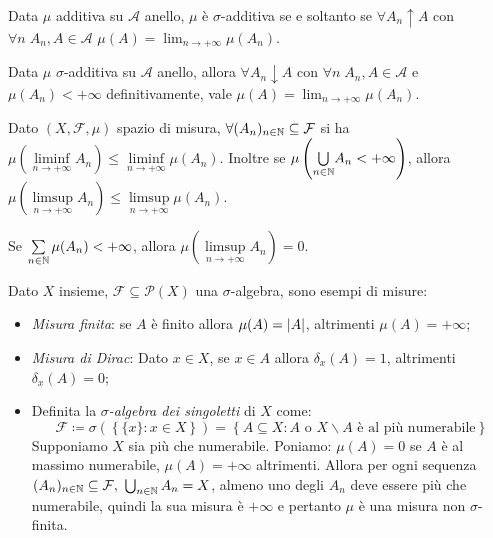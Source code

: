 \begin{exercise}
	Data $\mu$ additiva su $\mathcal{A}$ anello, $\mu$ è $\sigma$-additiva se e soltanto se $\forall A_n \uparrow A$ con $\forall n\; A_n,A \in \mathcal{A}$ $\mu(A)=\lim_{n\to +\infty} \mu(A_n)$.
\end{exercise}
\begin{exercise}
	Data $\mu$ $\sigma$-additiva su $\mathcal{A}$ anello, allora $\forall A_n \downarrow A$ con $\forall n\; A_n,A \in \mathcal{A}$ e $\mu(A_n) < + \infty$ definitivamente, vale $\mu(A)=\lim_{n\rightarrow +\infty} \mu(A_n)$.
\end{exercise}
\begin{exercise}
	Dato $(X,\mathcal{F}, \mu)$ spazio di misura, $\forall (A_n)_{n\in\mathbb{N}}\subseteq\mathcal{F}$  si ha $\mu\left(\underset{n\rightarrow +\infty}{\liminf} A_n\right) \leq \underset{n\rightarrow +\infty}{\liminf} \mu (A_n)$. Inoltre se $\mu\left(\underset{n\in\mathbb{N}}{\bigcup} A_n <+\infty\right)$, allora $\mu\left(\underset{n\rightarrow +\infty}{\limsup} A_n\right) \leq \underset{n\rightarrow +\infty}{\limsup} \mu (A_n)$.
\end{exercise}
\begin{exercise}
	Se $\sum\limits_{n\in\mathbb{N}} \mu(A_n) < +\infty$, allora $\mu\left(\underset{n\rightarrow +\infty}{\limsup} A_n\right)=0$.
\end{exercise}
\begin{example}
	Dato $X$ insieme, $\mathcal{F}\subseteq \mathscr{P}(X)$ una $\sigma$-algebra, sono esempi di misure:
	\begin{itemize}
		\item \emph{Misura finita}: se $A$ è finito allora $\mu(A)=\left|A\right|$, altrimenti $\mu(A)=+\infty$;
		\item \emph{Misura di Dirac}: Dato $x\in X$, se $x\in A$ allora $\delta_x(A)=1$, altrimenti $\delta_x(A)=0$;
		\item Definita la \emph{$\sigma$-algebra dei singoletti} di $ X $ come:
		\[ \mathcal{F} \coloneqq \sigma\left( \left\{ \{x\} : x\in X \right\} \right) = \left\{ A\subseteq X : A \text{ o } X\smallsetminus A \text{ è al più numerabile} \right\} \]
		Supponiamo $ X $ sia più che numerabile. Poniamo: $ \mu(A) = 0 $ se $ A $ è al massimo numerabile, $ \mu(A) = +\infty $ altrimenti. 
		Allora per ogni sequenza $(A_n)_{n\in\N}\subseteq\mathcal{F},\ \bigcup_{n\in\N} A_n=X$, almeno uno degli $A_n$ deve essere più che numerabile, quindi la sua misura è $+\infty$ e pertanto $ \mu $ è una misura non $ \sigma $-finita.
	\end{itemize}
\end{example}
